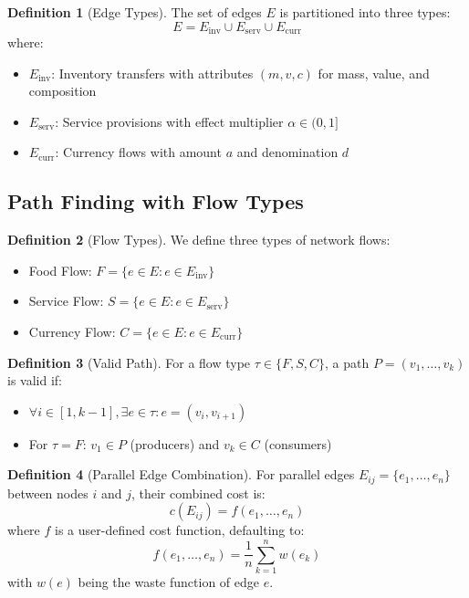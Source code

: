 \documentclass[12pt]{article}
\theoremstyle{definition}
\newtheorem{definition}{Definition}
\begin{document}
\begin{definition}[Edge Types]
The set of edges $E$ is partitioned into three types:
\begin{equation}
    E = E_{\text{inv}} \cup E_{\text{serv}} \cup E_{\text{curr}}
\end{equation}
where:
\begin{itemize}
    \item $E_{\text{inv}}$: Inventory transfers with attributes $(m, v, c)$ for mass, value, and composition
    \item $E_{\text{serv}}$: Service provisions with effect multiplier $\alpha \in (0,1]$
    \item $E_{\text{curr}}$: Currency flows with amount $a$ and denomination $d$
\end{itemize}
\end{definition}

\subsection{Path Finding with Flow Types}
\begin{definition}[Flow Types]
We define three types of network flows:
\begin{itemize}
    \item Food Flow: $F = \{e \in E : e \in E_{\text{inv}}\}$
    \item Service Flow: $S = \{e \in E : e \in E_{\text{serv}}\}$
    \item Currency Flow: $C = \{e \in E : e \in E_{\text{curr}}\}$
\end{itemize}
\end{definition}

\begin{definition}[Valid Path]
For a flow type $\tau \in \{F, S, C\}$, a path $P = (v_1, \ldots, v_k)$ is valid if:
\begin{itemize}
    \item $\forall i \in [1,k-1], \exists e \in \tau : e = (v_i, v_{i+1})$
    \item For $\tau = F$: $v_1 \in P$ (producers) and $v_k \in C$ (consumers)
\end{itemize}
\end{definition}

\begin{definition}[Parallel Edge Combination]
For parallel edges $E_{ij} = \{e_1, \ldots, e_n\}$ between nodes $i$ and $j$, their combined cost is:
\begin{equation}
    c(E_{ij}) = f(e_1, \ldots, e_n)
\end{equation}
where $f$ is a user-defined cost function, defaulting to:
\begin{equation}
    f(e_1, \ldots, e_n) = \frac{1}{n}\sum_{k=1}^n w(e_k)
\end{equation}
with $w(e)$ being the waste function of edge $e$.
\end{definition}
\end{document}
